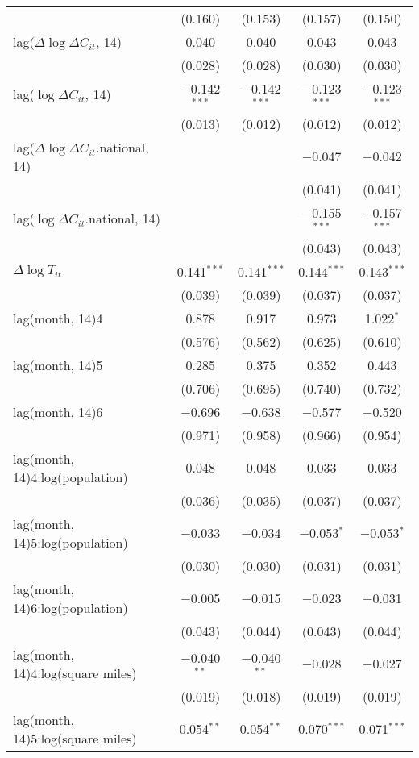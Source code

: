 \begin{tabular}{@{\extracolsep{1pt}}lcccc}
  & (0.160) & (0.153) & (0.157) & (0.150) \\ 
  lag($\Delta \log \Delta C_{it}$, 14) & 0.040 & 0.040 & 0.043 & 0.043 \\ 
  & (0.028) & (0.028) & (0.030) & (0.030) \\ 
  lag($\log \Delta C_{it}$, 14) & $-$0.142$^{***}$ & $-$0.142$^{***}$ & $-$0.123$^{***}$ & $-$0.123$^{***}$ \\ 
  & (0.013) & (0.012) & (0.012) & (0.012) \\ 
  lag($\Delta \log \Delta C_{it}$.national, 14) &  &  & $-$0.047 & $-$0.042 \\ 
  &  &  & (0.041) & (0.041) \\ 
  lag($\log \Delta C_{it}$.national, 14) &  &  & $-$0.155$^{***}$ & $-$0.157$^{***}$ \\ 
  &  &  & (0.043) & (0.043) \\ 
  $\Delta \log T_{it}$ & 0.141$^{***}$ & 0.141$^{***}$ & 0.144$^{***}$ & 0.143$^{***}$ \\ 
  & (0.039) & (0.039) & (0.037) & (0.037) \\ 
  lag(month, 14)4 & 0.878 & 0.917 & 0.973 & 1.022$^{*}$ \\ 
  & (0.576) & (0.562) & (0.625) & (0.610) \\ 
  lag(month, 14)5 & 0.285 & 0.375 & 0.352 & 0.443 \\ 
  & (0.706) & (0.695) & (0.740) & (0.732) \\ 
  lag(month, 14)6 & $-$0.696 & $-$0.638 & $-$0.577 & $-$0.520 \\ 
  & (0.971) & (0.958) & (0.966) & (0.954) \\ 
  lag(month, 14)4:log(population) & 0.048 & 0.048 & 0.033 & 0.033 \\ 
  & (0.036) & (0.035) & (0.037) & (0.037) \\ 
  lag(month, 14)5:log(population) & $-$0.033 & $-$0.034 & $-$0.053$^{*}$ & $-$0.053$^{*}$ \\ 
  & (0.030) & (0.030) & (0.031) & (0.031) \\ 
  lag(month, 14)6:log(population) & $-$0.005 & $-$0.015 & $-$0.023 & $-$0.031 \\ 
  & (0.043) & (0.044) & (0.043) & (0.044) \\ 
  lag(month, 14)4:log(square miles) & $-$0.040$^{**}$ & $-$0.040$^{**}$ & $-$0.028 & $-$0.027 \\ 
  & (0.019) & (0.018) & (0.019) & (0.019) \\ 
  lag(month, 14)5:log(square miles) & 0.054$^{**}$ & 0.054$^{**}$ & 0.070$^{***}$ & 0.071$^{***}$ \\ 

\end{tabular}
